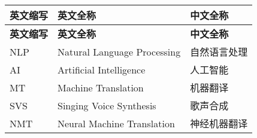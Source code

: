 \cleardoublepage
{}
\begin{center}
    \begin{longtable}{m{2cm}m{8cm}m{5cm}}
        \toprule
        \textbf{英文缩写}&\textbf{英文全称}&\textbf{中文全称}\\
        \hline
        \endfirsthead
        \toprule
        \textbf{英文缩写}&\textbf{英文全称}&\textbf{中文全称}\\
        \hline
        \endhead
        \bottomrule
        \endfoot
        \bottomrule
        \endlastfoot
        NLP&Natural Language Processing&自然语言处理\\
        AI&Artificial Intelligence&人工智能\\
        MT&Machine Translation&机器翻译\\
        SVS&Singing Voice Synthesis&歌声合成\\
        NMT&Neural Machine Translation&神经机器翻译\\
	\end{longtable}
\end{center}
